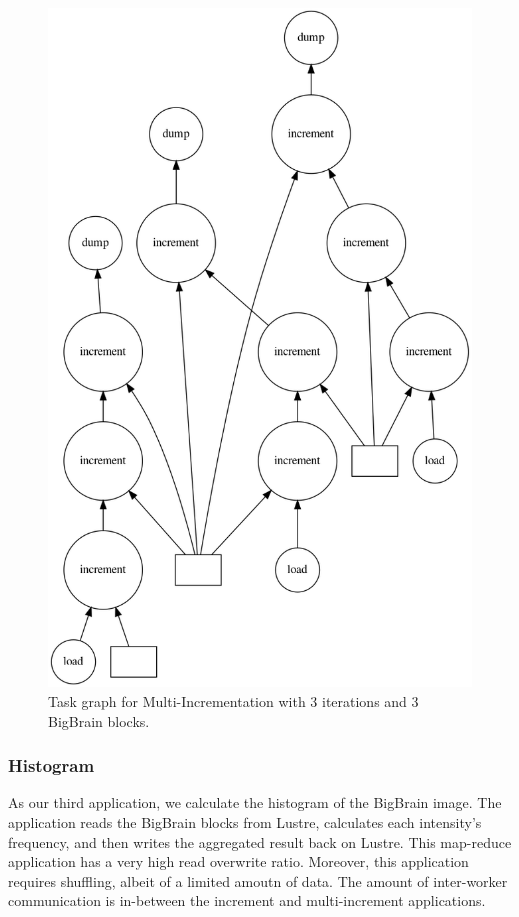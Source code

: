 \documentclass[conference]{IEEEtran}
\begin{document}
\begin{figure}[!hb]
	\centering
	\includegraphics[height=\columnwidth,
	angle=0]{figures/multi-increment.png}
	\caption{Task graph for Multi-Incrementation with 3 iterations and 3 BigBrain blocks.}
	\label{fig:graph-muti-increment}
\end{figure}
	
\subsubsection{Histogram}
As our third application, we calculate the histogram of the BigBrain image. 
The application reads the BigBrain blocks from Lustre, calculates each intensity's frequency, and then writes the aggregated result back on Lustre.
This map-reduce application has a very high read overwrite ratio.
Moreover, this application requires shuffling, albeit of a limited amoutn of data. 
The amount of inter-worker communication is in-between the increment and multi-increment applications.
\end{document}
